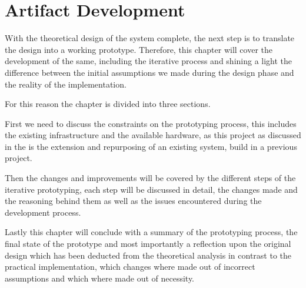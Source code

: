 \chapter{Artifact Development}
\label{ArtifactDevelopment}

With the theoretical design of the system complete,
the next step is to translate the design into a working prototype.
Therefore, this chapter will cover the development of the same,
including the iterative process and shining a light the difference between
the initial assumptions we made during the design phase and the reality of the implementation.

For this reason the chapter is divided into three sections.

First we need to discuss the constraints on the prototyping process,
this includes the existing infrastructure and the available hardware,
as this project as discussed in the  is the extension and repurposing of an existing system,
build in a previous project.

Then the changes and improvements will be covered by the different steps of
the iterative prototyping, each step will be discussed in detail, the changes made and the reasoning behind them
as well as the issues encountered during the development process.

Lastly this chapter will conclude with a summary of the prototyping process,
the final state of the prototype and most importantly a reflection upon
the original design which has been deducted from the theoretical analysis
in contrast to the practical implementation,
which changes where made out of incorrect assumptions and which where made out of necessity.












\pagebreak